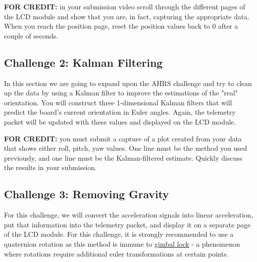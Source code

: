     \textbf{FOR CREDIT:} in your submission video scroll through the different pages of the LCD module and show that you are, in fact, capturing the appropriate data.
    When you reach the position page, reset the position values back to 0 after a couple of seconds.

    \subsection*{Challenge 2: Kalman Filtering}

    In this section we are going to expand upon the AHRS challenge and try to clean up the data by using a Kalman filter to improve the estimations of the "real" orientation.
    You will construct three 1-dimensional Kalman filters that will predict the board's current orientation in Euler angles.
    Again, the telemetry packet will be updated with these values and displayed on the LCD module.

    \textbf{FOR CREDIT:} you must submit a capture of a plot created from your data that shows either roll, pitch, yaw values.
    One line must be the method you used previously, and one line must be the Kalman-filtered estimate.
    Quickly discuss the results in your submission.

    \subsection*{Challenge 3: Removing Gravity}
    For this challenge, we will convert the acceleration signals into linear acceleration, put that information into the telemetry packet, and display it on a separate page of the LCD module.
    For this challenge, it is strongly recommended to use a quaternion rotation as this method is immune to \href{https://www.youtube.com/watch?v=zc8b2Jo7mno}{gimbal lock} - a phenomenon where rotations require additional euler transformations at certain points.

